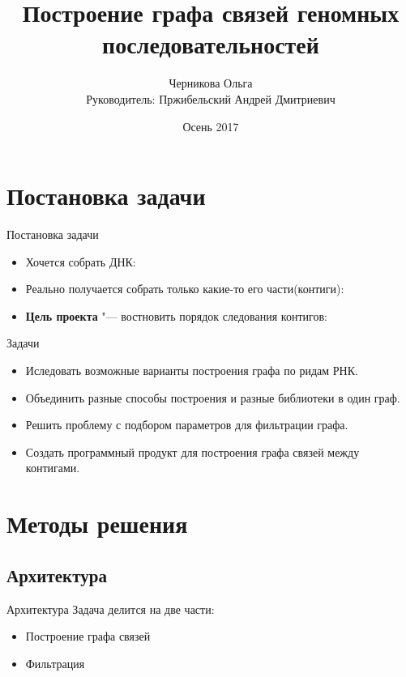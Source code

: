\documentclass{beamer}
\title[Граф связей между контигами]{Построение графа связей геномных последовательностей}
\author[Черникова Ольга]{Черникова Ольга\\
	Руководитель: Пржибельский Андрей Дмитриевич}
\institute{СПб АУ РАН}
\date{Осень 2017}
\newcommand{\cimg}[2]{%
	\begin{center}%
		\ifthenelse{\equal{#2}{}}{%
			\texttt{[image: \#1]}
		}{%
			\texttt{[image: \#1]}
		}%
	\end{center}%
}
\begin{document}
\begin{frame}
	\titlepage
\end{frame}

\section{Постановка задачи}

\begin{frame}[t]{Постановка задачи}
	\begin{itemize}
		\item Хочется собрать ДНК:
		\cimg{p1_1.png}{1}
		\item Реально получается собрать только какие-то его части(контиги):
		\cimg{p1_2.png}{0.25}
		\item \textbf{Цель проекта} "--- востновить порядок следования контигов:
		\cimg{p1_3.png}{1} 
	\end{itemize}
\end{frame}

\begin{frame}[t]{Задачи}
\begin{itemize}
\item Иследовать возможные варианты построения графа по ридам РНК. 
\item Объединить разные способы построения и разные 
библиотеки в один граф. 
\item Решить проблему с подбором параметров для фильтрации графа. 
\item Создать программный продукт для построения 
графа связей между контигами.  
\end{itemize}
\end{frame}	

\section{Методы решения}
\subsection{Архитектура}
\begin{frame}[t]{Архитектура}
Задача делится на две части:
\begin{itemize}
\item Построение графа связей
\item Фильтрация
\end{itemize}	
\cimg{src.jpg}{0.65}
\end{frame}
\end{document}
